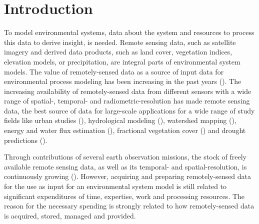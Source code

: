 \section{Introduction}


To model environmental systems, data about the system  and resources to process this data to derive insight, is needed. Remote sensing data, such as satellite imagery and derived data products, such as land cover, vegetation indices, elevation models, or precipitation, are integral parts of environmental system models. 
The value of remotely-sensed data as a source of input data for environmental process modeling has been increasing in the past years (\cite{melesse2007remote}). The increasing availability of remotely-sensed data from different sensors with a wide range of spatial-, temporal- and radiometric-resolution has made remote sensing data, the best source of data for large-scale applications for a wide range of study fields like urban studies (\cite{wu2000global}), hydrological modeling (\cite{bogh2004incorporating}), watershed mapping (\cite{melesse2003spatially}), energy and water flux estimation (\cite{melesse2005estimation}), fractional vegetation cover (\cite{carlson2000impact}) and drought predictions (\cite{rhee2010monitoring}).

Through contributions of several earth observation missions, the stock of freely available remote sensing data, as well as its temporal- and spatial-resolution, is continuously growing (\cite{melesse2007remote}).
However, acquiring and preparing remotely-sensed data for the use as input for an environmental system model is still related to significant expenditures of time, expertise, work and processing resources. The reason for the necessary spending is strongly related to how remotely-sensed data is acquired, stored, managed and provided.

